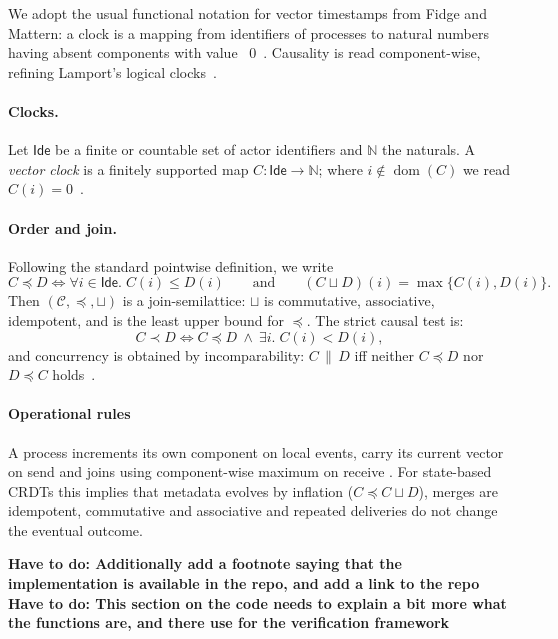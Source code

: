We adopt the usual functional notation for vector timestamps from Fidge and Mattern: a clock is a mapping from identifiers of processes to natural numbers having absent components with value ~$0$~\cite{fidge1988timestamps,mattern1989virtual}. Causality is read component-wise, refining Lamport’s logical clocks~\cite{lamport1978time}.

\paragraph{Clocks.} Let $\mathsf{Ide}$ be a finite or countable set of actor identifiers and $\mathbb{N}$ the naturals. A \emph{vector clock} is a finitely supported map $C:\mathsf{Ide}\to\mathbb{N}$; where $i\notin\operatorname{dom}(C)$ we read $C(i)=0$~\cite{fidge1988timestamps,mattern1989virtual}.

\paragraph{Order and join.} Following the standard pointwise definition, we write
\[
  C \preceq D \iff \forall i\in\mathsf{Ide}.\; C(i)\le D(i)
  \qquad\text{and}\qquad
  (C\sqcup D)(i) = \max\{C(i),D(i)\}.
\]
Then $(\mathcal{C},\preceq,\sqcup)$ is a join-semilattice: $\sqcup$ is commutative, associative, idempotent, and is the least upper bound for $\preceq$. The strict causal test is:
\[
  C \prec D \iff C \preceq D \ \wedge\ \exists i.\; C(i) < D(i),
\]
and concurrency is obtained by incomparability: $C \,\|\, D$ iff neither $C\preceq D$ nor $D\preceq C$ holds~\cite{lamport1978time,fidge1988timestamps,mattern1989virtual}.

\paragraph{Operational rules}
A process increments its own component on local events, carry its current vector on send and joins using component-wise maximum on receive \cite{fidge1988timestamps,mattern1989virtual}. For state-based CRDTs this implies that metadata evolves by inflation ($C\preceq C\sqcup D$), merges are idempotent, commutative and associative and repeated  deliveries do not change the eventual outcome.

\textbf{Have to do: Additionally add a footnote saying that the implementation is available in the repo, and add a link to the repo}
\textbf{Have to do: This section on the code needs to explain a bit more what the functions are, and there use for the verification framework}
